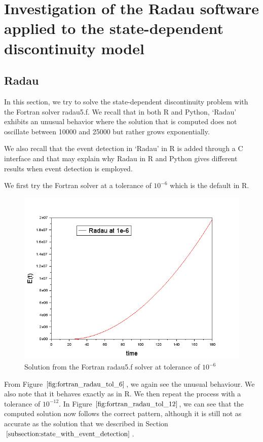 
\section{Investigation of the Radau software applied to the state-dependent discontinuity model}
\label{section:fortran_inaccuracies}
\subsection{Radau}
In this section, we try to solve the state-dependent discontinuity problem with the Fortran solver radau5.f. We recall that in both R and Python, `Radau' exhibits an unusual behavior where the solution that is computed does not oscillate between 10000 and 25000 but rather grows exponentially. 

We also recall that the event detection in `Radau' in R is added through a C interface and that may explain why Radau in R and Python gives different results when event detection is employed.

We first try the Fortran solver at a tolerance of $10^{-6}$ which is the default in R.
\begin{figure}[h]
\centering
\includegraphics[width=0.7\linewidth]{./figures/fortran_radau_tol_6}
\caption{Solution from the Fortran radau5.f solver at tolerance of $10^{-6}$}
\label{fig:fortran_radau_tol_6}
\end{figure}

From Figure $\ref{fig:fortran_radau_tol_6}$, we again see the unusual behaviour. We also note that it behaves exactly as in R. We then repeat the process with a tolerance of $10^{-12}$. In Figure $\ref{fig:fortran_radau_tol_12}$, we can see that the computed solution now follows the correct pattern, although it is still not as accurate as the solution that we described in Section $\ref{subsection:state_with_event_detection}$.

